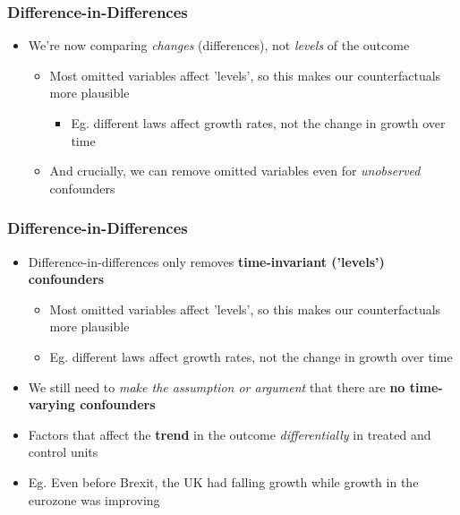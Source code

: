 \documentclass[xcolor=x11names,compress]{beamer}\usepackage[]{graphicx}\usepackage[]{xcolor}
\renewcommand{\(}{\begin{columns}}
\renewcommand{\)}{\end{columns}}
\newcommand{\<}[1]{\begin{column}{#1}}
\renewcommand{\>}{\end{column}}
\begin{document}
\begin{frame}
\frametitle{Difference-in-Differences}
\begin{itemize}
\item We're now comparing \textit{changes} (differences), not \textit{levels} of the outcome
\begin{itemize}
\item Most omitted variables affect 'levels', so this makes our counterfactuals more plausible
\begin{itemize}
\item Eg. different laws affect growth rates, not the change in growth over time
\end{itemize}
\item And crucially, we can remove omitted variables even for \textit{unobserved} confounders
\end{itemize}
\end{itemize}
\end{frame}

\begin{frame}
\frametitle{Difference-in-Differences}
\begin{itemize}
\item Difference-in-differences only removes \textbf{time-invariant ('levels') confounders}
\pause
\begin{itemize}
\item Most omitted variables affect 'levels', so this makes our counterfactuals more plausible
\pause
\item Eg. different laws affect growth rates, not the change in growth over time
\pause
\end{itemize}
\item We still need to \textit{make the assumption or argument} that there are \textbf{no time-varying confounders}
\pause
\item Factors that affect the \textbf{trend} in the outcome \textit{differentially} in treated and control units
\pause
\item Eg. Even before Brexit, the UK had falling growth while growth in the eurozone was improving
\end{itemize}
\end{frame}
\end{document}

